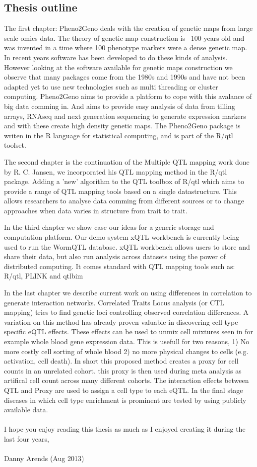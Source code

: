 \subsection{Thesis outline}

The first chapter: Pheno2Geno deals with the creation of genetic maps from large scale omics data. 
The theory of genetic map construction is ~100 years old and was invented in a time where 100 
phenotype markers were a dense genetic map. In recent years software has been developed to do these 
kinds of analysis. However looking at the software available for genetic maps construction we 
observe that many packages come from the 1980s and 1990s and have not been adapted yet to use new 
technologies such as multi threading or cluster computing. Pheno2Geno aims to provide a platform to 
cope with this avalance of big data comming in. And aims to provide easy analysis of data from 
tilling arrays, RNAseq and next generation sequencing to generate expression markers and with these 
create high density genetic maps. The Pheno2Geno package is writen in the R language for statistical 
computing, and is part of the R/qtl toolset.

The second chapter is the continuation of the Multiple QTL mapping work done by R. C. Jansen, we 
incorporated his QTL mapping method in the R/qtl package. Adding a 'new' algorithm to the QTL 
toolbox of R/qtl which aims to provide a range of QTL mapping tools based on a single datastructure. 
This allows researchers to analyse data comming from different sources or to change approaches when 
data varies in structure from trait to trait.

In the third chapter we show case our ideas for a generic storage and computation platform. Our demo 
system xQTL workbench is currently being used to run the WormQTL database. xQTL workbench allows 
users to store and share their data, but also run analysis across datasets using the power of 
distributed computing. It comes standard with  QTL mapping tools such as: R/qtl, PLINK and qtlbim

In the last chapter we describe current work on using differences in correlation to generate 
interaction networks. Correlated Traits Locus analysis (or CTL mapping) tries to find genetic 
loci controlling observed correlation differences. A variation on this method has already proven 
valuable in discovering cell type specific eQTL effects. These effects can be used to unmix cell 
mixtures seen in for example whole blood gene expression data. This is usefull for two reasons, 
1) No more costly cell sorting of whole blood 2) no more physical changes to cells (e.g. activation, 
cell death). In short this proposed method creates a proxy for cell counts in an unrelated cohort. 
this proxy is then used during meta analysis as artifical cell count across many different cohorts.
The interaction effects between QTL and Proxy are used to assign a cell type to each eQTL. In the final 
stage diseases in which cell type enrichment is prominent are tested by using publicly available data.\\\\

I hope you enjoy reading this thesis as much as I enjoyed creating it during the last four years,\\\\

Danny Arends (Aug 2013)
